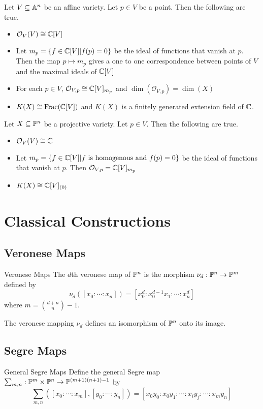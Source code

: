 \documentclass[a4paper]{article}
\begin{document}
\begin{thm}{}{} Let $V\subseteq\mathbb{A}^n$ be an affine variety. Let $p\in V$ be a point. Then the following are true. 
\begin{itemize}
\item $\mathcal{O}_V(V)\cong\mathbb{C}[V]$
\item Let $m_p=\{f\in\mathbb{C}[V]|f(p)=0\}$ be the ideal of functions that vanish at $p$. Then the map $p\mapsto m_p$ gives a one to one correspondence between points of $V$ and the maximal ideals of $\mathbb{C}[V]$
\item For each $p\in V$, $\mathcal{O}_{V,p}\cong\mathbb{C}[V]_{m_p}$ and $\dim(\mathcal{O}_{V,p})=\dim(X)$
\item $K(X)\cong\text{Frac}(\mathbb{C}[V])$ and $K(X)$ is a finitely generated extension field of $\mathbb{C}$. 
\end{itemize}
\end{thm}

\begin{thm}{}{} Let $X\subseteq\mathbb{P}^n$ be a projective variety. Let $p\in V$. Then the following are true. 
\begin{itemize}
\item $\mathcal{O}_V(V)\cong\mathbb{C}$
\item Let $m_p=\{f\in\mathbb{C}[V]|f\text{ is homogenous and }f(p)=0\}$ be the ideal of functions that vanish at $p$. Then $\mathcal{O}_{V,p}=\mathbb{C}[V]_{m_p}$
\item $K(X)\cong\mathbb{C}[V]_{(0)}$
\end{itemize}
\end{thm}

\pagebreak
\section{Classical Constructions}
\subsection{Veronese Maps}
\begin{defn}{Veronese Maps}{} The $d$th veronese map of $\mathbb{P}^n$ is the morphism $\nu_d:\mathbb{P}^n\to\mathbb{P}^m$ defined by $$\nu_d([x_0:\cdots:x_n])=[x_0^d:x_0^{d-1}x_1:\cdots:x_n^d]$$ where $m=\binom{d+n}{n}-1$. 
\end{defn}

\begin{prp}{}{} The veronese mapping $\nu_d$ defines an isomorphism of $\mathbb{P}^n$ onto its image. 
\end{prp}

\subsection{Segre Maps}
\begin{defn}{General Segre Maps}{} Define the general Segre map $\sum_{m,n}:\mathbb{P}^m\times\mathbb{P}^n\to\mathbb{P}^{(m+1)(n+1)-1}$ by $$\sum_{m,n}([x_0:\cdots:x_m],[y_0:\cdots:y_n])=[x_0y_0:x_0y_1:\cdots:x_iy_j:\cdots:x_my_n]$$
\end{defn}
\end{document}
